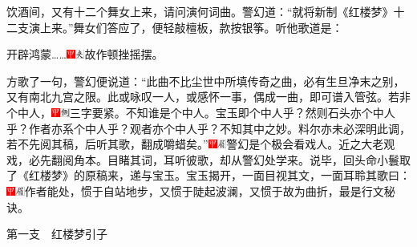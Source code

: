 饮酒间，又有十二个舞女上来，请问演何词曲。警幻道：``就将新制《红楼梦》十二支演上来。''舞女们答应了，便轻敲檀板，款按银筝。听他歌道是：

开辟鸿蒙\ldots{}\ldots{}{\includegraphics[width=3mm]{../Images/00002}\includegraphics[width=3mm]{../Images/00012}\footnotesize \kaishu 故作顿挫摇摆。}

方歌了一句，警幻便说道：``此曲不比尘世中所填传奇之曲，必有生旦净末之别，又有南北九宫之限。此或咏叹一人，或感怀一事，偶成一曲，即可谱入管弦。若非个中人，{\includegraphics[width=3mm]{../Images/00002}\includegraphics[width=3mm]{../Images/00011}\footnotesize \kaishu 三字要紧。不知谁是个中人。宝玉即个中人乎？然则石头亦个中人乎？作者亦系个中人乎？观者亦个中人乎？}不知其中之妙。料尔亦未必深明此调，若不先阅其稿，后听其歌，翻成嚼蜡矣。''{\includegraphics[width=3mm]{../Images/00002}\includegraphics[width=3mm]{../Images/00010}\footnotesize \kaishu 警幻是个极会看戏人。近之大老观戏，必先翻阅角本。目睹其词，耳听彼歌，却从警幻处学来。}说毕，回头命小鬟取了《红楼梦》的原稿来，递与宝玉。宝玉揭开，一面目视其文，一面耳聆其歌曰：{\includegraphics[width=3mm]{../Images/00002}\includegraphics[width=3mm]{../Images/00010}\footnotesize \kaishu 作者能处，惯于自站地步，又惯于陡起波澜，又惯于故为曲折，最是行文秘诀。}

第一支　红楼梦引子

